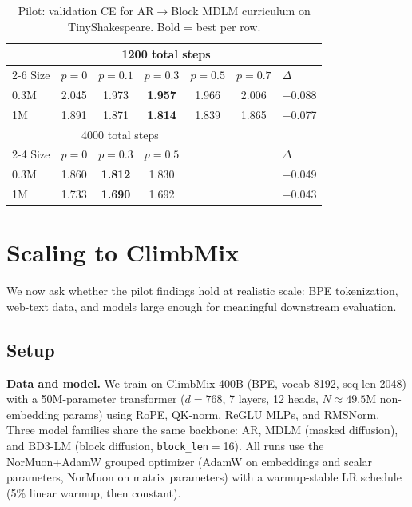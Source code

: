 \documentclass{article}
\begin{document}
\begin{table}[t]
\centering
\caption{Pilot: validation CE for AR$\to$Block MDLM curriculum on
TinyShakespeare. Bold = best per row.}
\label{tab:pilot_curriculum}
\vspace{2pt}
\small
\begin{tabular}{lcccccl}
\toprule
& \multicolumn{5}{c}{1200 total steps} & \\
\cmidrule(lr){2-6}
Size & $p{=}0$ & $p{=}0.1$ & $p{=}0.3$ & $p{=}0.5$ & $p{=}0.7$ & $\Delta$ \\
\midrule
0.3M & 2.045 & 1.973 & \textbf{1.957} & 1.966 & 2.006 & $-$0.088 \\
1M   & 1.891 & 1.871 & \textbf{1.814} & 1.839 & 1.865 & $-$0.077 \\
\midrule
& \multicolumn{3}{c}{4000 total steps} & & & \\
\cmidrule(lr){2-4}
Size & $p{=}0$ & $p{=}0.3$ & $p{=}0.5$ & & & $\Delta$ \\
\midrule
0.3M & 1.860 & \textbf{1.812} & 1.830 & & & $-$0.049 \\
1M   & 1.733 & \textbf{1.690} & 1.692 & & & $-$0.043 \\
\bottomrule
\end{tabular}
\vspace{-8pt}
\end{table}


\section{Scaling to ClimbMix}
\label{sec:climbmix}

We now ask whether the pilot findings hold at realistic scale: BPE
tokenization, web-text data, and models large enough for meaningful downstream
evaluation.

\subsection{Setup}

\textbf{Data and model.}
We train on ClimbMix-400B (BPE, vocab 8192, seq len 2048) with a
50M-parameter transformer ($d{=}768$, 7 layers, 12 heads,
$N \approx 49.5\text{M}$ non-embedding params) using RoPE, QK-norm, ReGLU
MLPs, and RMSNorm.  Three model families share the same backbone: AR,
MDLM (masked diffusion), and BD3-LM (block diffusion,
\texttt{block\_len}$=$16).
All runs use the NorMuon+AdamW grouped optimizer (AdamW on embeddings and
scalar parameters, NorMuon on matrix parameters) with a warmup-stable LR
schedule (5\% linear warmup, then constant).
\end{document}
